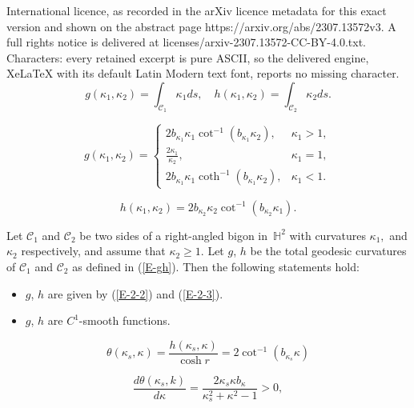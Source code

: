 \documentclass[10pt,a4paper]{amsart}
\begin{document}
International licence, as recorded in the arXiv licence metadata for this exact version and shown on the abstract page https://arxiv.org/abs/2307.13572v3. A full rights notice is delivered at licenses/arxiv-2307.13572-CC-BY-4.0.txt. Characters: every retained excerpt is pure ASCII, so the delivered engine, XeLaTeX with its default Latin Modern text font, reports no missing character.
\begin{equation}\label{E-gh}g(\kappa_1,\kappa_2)=\int_{\mathcal C_1}\kappa_1ds,\quad h(\kappa_1,\kappa_2)=\int_{\mathcal C_2}\kappa_2ds.\end{equation}

\begin{equation}\label{E-2-2}
g(\kappa_1,\kappa_2)
=
\begin{cases}
2b_{\kappa_1}\kappa_1\cot^{-1}(b_{\kappa_1}\kappa_2),
& \kappa_1>1,\\
\frac{2\kappa_1}{\kappa_2},
& \kappa_1=1,\\
2b_{\kappa_1}\kappa_1\coth^{-1}(b_{\kappa_1}\kappa_2),
& \kappa_1<1.
\end{cases}
\end{equation}

\begin{equation}\label{E-2-3}
h(\kappa_1,\kappa_2)
=2b_{\kappa_2}\kappa_2\cot^{-1}(b_{\kappa_2}\kappa_1).
\end{equation}

\begin{lemma}\label{L-3-3}
 Let $\mathcal C_1$ and $\mathcal C_2$ be two sides of a right-angled bigon in~$\mathbb H^2$ with curvatures $\kappa_1,$ and $\kappa_2$ respectively, and assume that $\kappa_2\geq 1$. Let $g$, $h$ be the total geodesic curvatures of $\mathcal C_1$ and $\mathcal C_2$ as defined in (\ref{E-gh}).
 Then the following statements hold:
\begin{itemize}
\item[($i$)] $g$, $h$ are given by (\ref{E-2-2}) and (\ref{E-2-3}).
\item[($ii$)]  $g$, $h$ are $C^1$-smooth functions.
\end{itemize}
\end{lemma}

\begin{equation}\label{E-3-7}\theta(\kappa_s,\kappa)=\frac{h(\kappa_s,\kappa)}{\cosh r}=2\cot^{-1}(b_{\kappa_s}\kappa)\end{equation}

\begin{equation}\label{E-2-8}\frac{d\theta(\kappa_s,k)}{d\kappa}=\frac{2\kappa_s\kappa b_{\kappa}}{\kappa_s^2+\kappa^2-1}>0,\end{equation}
\end{document}
